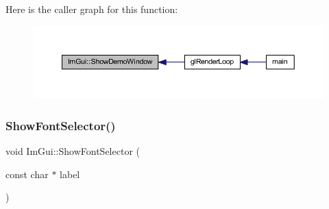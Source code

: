 Here is the caller graph for this function\+:
\nopagebreak
\begin{figure}[H]
\begin{center}
\leavevmode
\includegraphics[width=350pt]{namespace_im_gui_af95643a0ce4893b9e57c12991922fb18_icgraph}
\end{center}
\end{figure}
\mbox{\label{namespace_im_gui_a0bdce99eef17ef1e1fef40a18bd811ab}} 
\subsubsection{\texorpdfstring{Show\+Font\+Selector()}{ShowFontSelector()}}
{\footnotesize\ttfamily void Im\+Gui\+::\+Show\+Font\+Selector (\begin{DoxyParamCaption}\item[{const char $\ast$}]{label }\end{DoxyParamCaption})}

